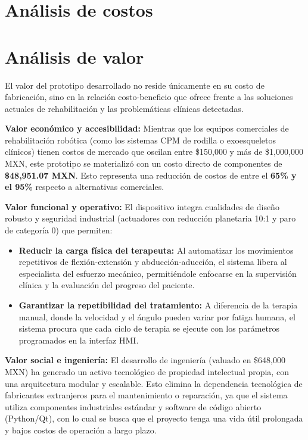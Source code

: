 \clearpage
\section{Análisis de costos}

\section{Análisis de valor}
El valor del prototipo desarrollado no reside únicamente en su costo de fabricación, sino en la relación costo-beneficio que ofrece frente a las soluciones actuales de rehabilitación y las problemáticas clínicas detectadas.

\textbf{Valor económico y accesibilidad:}
Mientras que los equipos comerciales de rehabilitación robótica (como los sistemas CPM de rodilla o exoesqueletos clínicos) tienen costos de mercado que oscilan entre \$150,000 y más de \$1,000,000 MXN, este prototipo se materializó con un costo directo de componentes de \textbf{\$48,951.07 MXN}. Esto representa una reducción de costos de entre el \textbf{65\% y el 95\%} respecto a alternativas comerciales.

\textbf{Valor funcional y operativo:}
El dispositivo integra cualidades de diseño robusto y seguridad industrial (actuadores con reducción planetaria 10:1 y paro de categoría 0) que permiten:
\begin{itemize}
    \item \textbf{Reducir la carga física del terapeuta:} Al automatizar los movimientos repetitivos de flexión-extensión y abducción-aducción, el sistema libera al especialista del esfuerzo mecánico, permitiéndole enfocarse en la supervisión clínica y la evaluación del progreso del paciente.
    \item \textbf{Garantizar la repetibilidad del tratamiento:} A diferencia de la terapia manual, donde la velocidad y el ángulo pueden variar por fatiga humana, el sistema procura que cada ciclo de terapia se ejecute con los parámetros programados en la interfaz HMI.
\end{itemize}

\textbf{Valor social e ingeniería:}
El desarrollo de ingeniería (valuado en \$648,000 MXN) ha generado un activo tecnológico de propiedad intelectual propia, con una arquitectura modular y escalable. Esto elimina la dependencia tecnológica de fabricantes extranjeros para el mantenimiento o reparación, ya que el sistema utiliza componentes industriales estándar y software de código abierto (Python/Qt), con lo cual se busca que el proyecto tenga una vida útil prolongada y bajos costos de operación a largo plazo.



\endinput